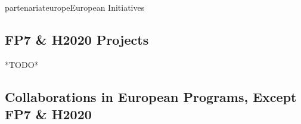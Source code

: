 \documentclass{ra2018}
\begin{document}
\begin{module}{partenariat}{europe}{European Initiatives}

\subsection{FP7 \& H2020 Projects}
*TODO*






\subsection{Collaborations in European Programs, Except FP7 \& H2020}



\end{module}
\end{document}
